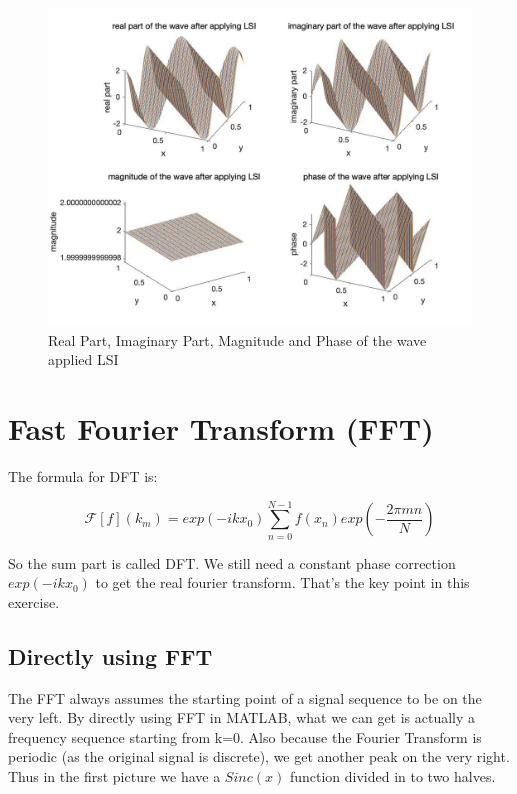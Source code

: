\documentclass[11pt,a4paper,BCOR12mm, headexclude, footexclude, twoside, openright]{scrartcl}
\numberwithin{equation}{section} %
\numberwithin{figure}{section} %
\numberwithin{table}{section} %
\begin{document}
\begin{figure}[h!]
\centering
\includegraphics[scale=0.35]{wave3.jpg}
\caption{Real Part, Imaginary Part, Magnitude and Phase of the wave applied LSI}
\end{figure}

\newpage
\section{Fast Fourier Transform (FFT)}

The formula for DFT is:

\begin{equation}
    \mathcal{F}[f](k_m) = exp(-i k x_0) \sum_{n=0}^{N-1} f(x_n) exp(-\frac{2 \pi m n}{N})
\end{equation}

So the sum part is called DFT. We still need a constant phase correction $exp(-i k x_0) $ to get the real fourier transform. That's the key point in this exercise.


\subsection{Directly using FFT}

The FFT always assumes the starting point of a signal sequence to be on the very left. By directly using FFT in MATLAB, what we can get is actually a frequency sequence starting from k=0. Also because the Fourier Transform is periodic (as the original signal is discrete), we get another peak on the very right. Thus in the first picture we have a $Sinc(x)$ function divided in to two halves.
\end{document}
